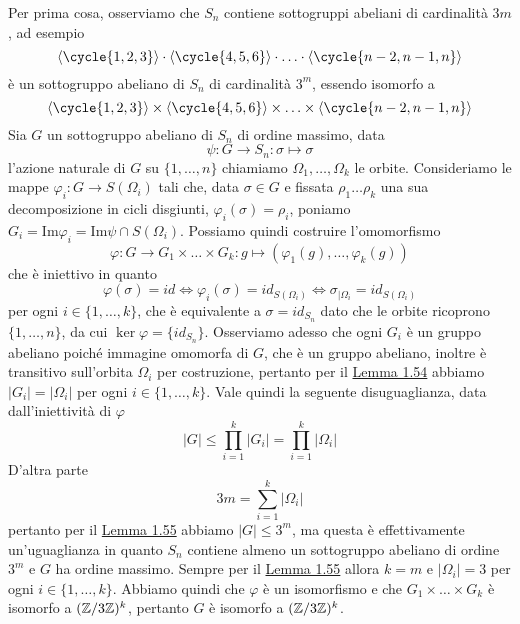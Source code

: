 \documentclass[11pt]{scrartcl}
\begin{document}
\begin{soln}
    Per prima cosa, osserviamo che $S_n$ contiene sottogruppi abeliani di
    cardinalità $3m$, ad esempio
    \[
        \langle\cycle{1, 2, 3}\rangle\cdot \langle\cycle{4, 5, 6}\rangle
        \cdot \ldots \cdot \langle\cycle{n - 2, n - 1, n}\rangle
    \]
    è un sottogruppo abeliano di $S_n$ di cardinalità $3^m$, essendo 
    isomorfo a
    \[
        \langle\cycle{1, 2, 3}\rangle\times\langle\cycle{4, 5, 6}\rangle
        \times\ldots\times\langle\cycle{n - 2, n - 1, n}\rangle
    \]
    Sia $G$ un sottogruppo abeliano di $S_n$ di ordine massimo, data
    \[
        \psi: G\longrightarrow S_n : \sigma \longmapsto \sigma
    \]
    l'azione naturale di $G$ su $\{1, \ldots, n\}$ chiamiamo $\Omega_1, \ldots, \Omega_k$
    le orbite. Consideriamo le mappe $\varphi_i : G \longrightarrow S(\Omega_i)$
    tali che, data $\sigma \in G$ e fissata $\rho_1\ldots\rho_k$ una sua decomposizione
    in cicli disgiunti, $\varphi_i(\sigma) = \rho_i$, poniamo $G_i = \mathrm{Im}\varphi_i=
    \mathrm{Im}\psi \cap S(\Omega_i)$. Possiamo quindi costruire l'omomorfismo
    \[
        \varphi: G \longrightarrow G_1\times \ldots \times G_k : g \longmapsto (\varphi_1(g), \ldots, \varphi_k(g))
    \]
    che è iniettivo in quanto 
    \[
        \varphi(\sigma) = id \iff \varphi_i(\sigma) = id_{S(\Omega_i)} \iff 
        \sigma_{\mid \Omega_i} = id_{S(\Omega_i)}
    \]
    per ogni $i \in \{1, \ldots, k\}$, che è equivalente a $\sigma = id_{S_n}$
    dato che le orbite ricoprono $\{1, \ldots, n\}$, da cui $\ker\varphi = 
    \{id_{S_n}\}$. Osserviamo adesso che ogni $G_i$ è un gruppo abeliano poiché
    immagine omomorfa di $G$, che è un gruppo abeliano, inoltre è transitivo
    sull'orbita $\Omega_i$ per costruzione, pertanto per il 
    \hyperref[lemma1.54]{Lemma 1.54} abbiamo $|G_i| = |\Omega_i|$ per ogni 
     $i \in \{1, \ldots, k\}$. Vale quindi la seguente disuguaglianza, data
    dall'iniettività di $\varphi$
    \[
        |G| \leqslant \prod_{i = 1}^k|G_i| = \prod_{i = 1}^k |\Omega_i|
    \]
    D'altra parte
    \[
        3m = \sum_{i = 1}^k|\Omega_i|
    \]pertanto per il \hyperref[lemma1.55]{Lemma 1.55} abbiamo $|G| \leq 3^m$, 
    ma questa è effettivamente un'uguaglianza in quanto $S_n$ contiene
    almeno un sottogruppo abeliano di ordine $3^m$ e $G$ ha ordine massimo.
    Sempre per il \hyperref[lemma1.55]{Lemma 1.55} allora $k = m$ e $|\Omega_i| = 3$
    per ogni $i \in \{1, \ldots, k\}$. Abbiamo quindi che $\varphi$ è un isomorfismo
    e che $G_1\times\ldots\times G_k$ è isomorfo a $(\mathbb{Z}/{3}\mathbb{Z})^k$, pertanto
    $G$ è isomorfo a $(\mathbb{Z}/{3}\mathbb{Z})^k$.
\end{soln}
\end{document}
